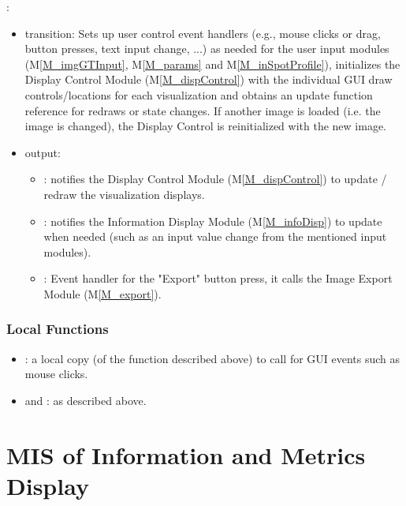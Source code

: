 \documentclass[12pt, titlepage]{article}
\newcommand{\mref}[1]{M\ref{#1}}
\newcommand{\mrefp}[1]{(\mref{#1})}
\newcommand{\mreff}[1]{Module \mrefp{#1}}
\begin{document}
\noindent {}:
\begin{itemize}
  \item transition: Sets up user control event handlers (e.g., mouse clicks or drag, button presses, text input change, ...)
    as needed for the user input modules (\mref{M_imgGTInput}, \mref{M_params} and \mref{M_inSpotProfile}),
    initializes the Display Control \mreff{M_dispControl}
    with the individual GUI draw controls/locations for each visualization
    and obtains an update function reference for redraws or state changes.
    If another image is loaded (i.e. the image is changed),
    the Display Control is reinitialized with the new image.
    \newline{}
  \item output: 
    \begin{itemize}
      \item {}: notifies the Display Control \mreff{M_dispControl} to update / redraw the visualization displays.
      \item {}: notifies the Information Display \mreff{M_infoDisp} to update when needed (such as
      an input value change from the mentioned input modules).
      \item {}: Event handler for the "Export" button press, it calls the Image Export \mreff{M_export}.
    \end{itemize}
\end{itemize}

\subsubsection{Local Functions}
\begin{itemize}
  \item {}: a local copy (of the function described above) to call for GUI events such as mouse clicks.
  \item {} and : as described above.
\end{itemize}

\newpage



\section{MIS of Information and Metrics Display} \label{MS_infoDisp}
\end{document}
